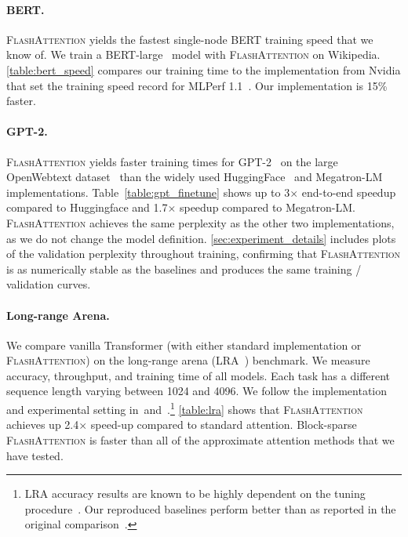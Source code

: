 \paragraph{BERT.}
\textsc{FlashAttention} yields the fastest single-node BERT training speed that we know of. We train a BERT-large~\citep{devlin2018bert} model with \textsc{FlashAttention} on Wikipedia.
\ref{table:bert_speed} compares our training time to the implementation from Nvidia that set the training speed record for MLPerf 1.1~\citep{mattson2020mlperf}. Our implementation is 15\% faster.

\paragraph{GPT-2.}
\textsc{FlashAttention} yields faster training times for GPT-2~\citep{radford2019language} on the large OpenWebtext dataset~\citep{Gokaslan2019OpenWeb} than the widely used HuggingFace~\citep{wolf-etal-2020-transformers} and Megatron-LM~\citep{shoeybi2019megatron} implementations.
Table~\ref{table:gpt_finetune} shows up to 3$\times$ end-to-end speedup compared to Huggingface and 1.7$\times$ speedup compared to Megatron-LM.
\textsc{FlashAttention} achieves the same perplexity as the other two implementations, as we do not change the model definition.
\ref{sec:experiment_details} includes plots of the validation perplexity throughout training, confirming that \textsc{FlashAttention} is as numerically stable as the baselines and produces the same training / validation curves.

\paragraph{Long-range Arena.} We compare vanilla Transformer (with either standard implementation or \textsc{FlashAttention})
on the long-range arena (LRA~\citep{tay2020long}) benchmark. We measure accuracy, throughput, and training time of all models. Each task has a different sequence length varying between 1024 and 4096. We follow the implementation and experimental setting
in~\citet{tay2020long}and~\citet{xiong2021nystromformer}.\footnote{LRA accuracy results are known to be highly dependent on the tuning procedure~\citep{xiong2021nystromformer}. Our reproduced baselines perform better than as reported in the original comparison~\citep{tay2020long}.}
\ref{table:lra} shows that \textsc{FlashAttention} achieves up 2.4$\times$
speed-up compared to standard attention. Block-sparse \textsc{FlashAttention} is faster than all of the approximate attention methods that we have tested.


